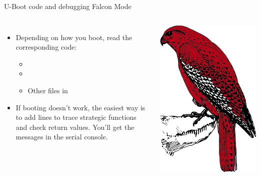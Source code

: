 \begin{frame}{U-Boot code and debugging Falcon Mode}
  \begin{columns}
  \begin{itemize}
     \item Depending on how you boot, read the corresponding code:
        \begin{itemize}
	   \item {}
	   \item {}
	   \item Other files in 
	\end{itemize}
     \item If booting doesn't work, the easiest way is to add
	    lines to trace strategic functions
	   and check return values. You'll get the messages in the
	   serial console.
  \end{itemize}
    \begin{center}
     \includegraphics[height=0.6\textheight]{slides/boot-time-u-boot-falcon-mode/falcon-red.png}
    \end{center}
  \end{columns}
\end{frame}

